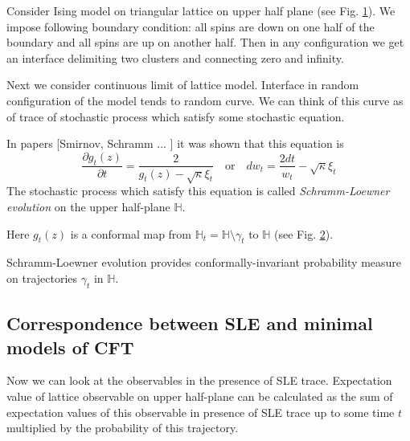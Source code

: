 \documentclass[12pt]{article}
\theoremstyle{definition}
\theoremstyle{definition} \newtheorem{Def}{Definition}
\begin{document}
Consider Ising model on triangular lattice on upper half plane (see Fig. \ref{fig:sle}). We impose following boundary condition: all spins are down on one half of the boundary and all spins are up on another half. Then in any configuration we get an interface delimiting two clusters and connecting zero and infinity. 

\begin{figure}[h]
  \label{fig:sle}
\end{figure}

Next we consider continuous limit of lattice model. Interface in random configuration of the model tends to random curve. We can think of this curve as of trace of stochastic process which satisfy some stochastic equation. 

In papers [Smirnov, Schramm ... ] it was shown that this equation is
\begin{equation*}
  \frac{\partial g_t(z)}{\partial t} = \frac{ 2}{g_t(z)-\sqrt{\kappa}\xi_{t}} \quad \text{or} \quad       d w _{t}= \frac{2dt}{w_{t} }-\sqrt{\kappa}\xi_{t}
\end{equation*}
The stochastic process which satisfy this equation is called     {\it Schramm-Loewner evolution} on the upper half-plane $\mathbb{H}$.

Here $g_{t}(z)$ is a conformal map from $\mathbb{H}_{t}=\mathbb{H}\setminus \gamma_{t}$ to $\mathbb{H}$ (see Fig. \ref{fig:sle2}).
\begin{figure}[h]
  \label{fig:sle2}
\end{figure}

Schramm-Loewner evolution provides conformally-invariant probability measure on trajectories $\gamma_{t}$ in $\mathbb{H}$.

\subsection{Correspondence between SLE and minimal models of CFT}

Now we can look at the observables in the presence of SLE trace. Expectation value of lattice observable on upper half-plane can be calculated as the sum of expectation values of this observable in presence of SLE trace up to some time $t$ multiplied by the probability of this trajectory. 
\end{document}
